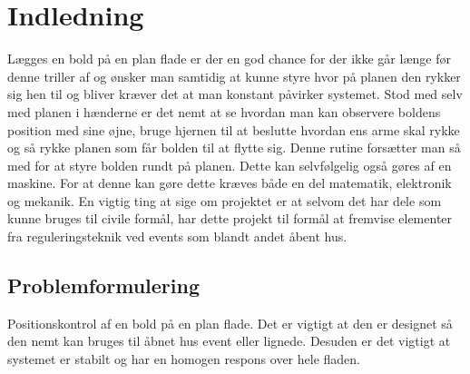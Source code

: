 \chapter{Indledning}
Lægges en bold på en plan flade er der en god chance for der ikke går længe før denne triller af og ønsker man samtidig at kunne styre hvor på planen den rykker sig hen til og bliver kræver det at man konstant påvirker systemet. Stod med selv med planen i hænderne er det nemt at se hvordan man kan observere boldens position med sine øjne, bruge hjernen til at beslutte hvordan ens arme skal rykke og så rykke planen som får bolden til at flytte sig. Denne rutine forsætter man så med for at styre bolden rundt på planen. Dette kan selvfølgelig også gøres af en maskine. For at denne kan gøre dette kræves både en del matematik, elektronik og mekanik. En vigtig ting at sige om projektet er at selvom det har dele som kunne bruges til civile formål, har dette projekt til formål at fremvise elementer fra reguleringsteknik ved events som blandt andet åbent hus.

\section{Problemformulering}
Positionskontrol af en bold på en plan flade. Det er vigtigt at den er designet så den nemt kan bruges til åbnet hus event eller lignede. Desuden er det vigtigt at systemet er stabilt og har en homogen respons over hele fladen.
\clearpage
